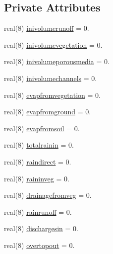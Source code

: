 \subsection*{Private Attributes}
\begin{DoxyCompactItemize}
\item 
real(8) \mbox{\hyperlink{structmodulebasin_1_1t__watermassbalance_a207bc9b7cd8688189b7627d620f7df89}{inivolumerunoff}} = 0.
\item 
real(8) \mbox{\hyperlink{structmodulebasin_1_1t__watermassbalance_a5e02f1cf320ca7836d46605f1390851f}{inivolumevegetation}} = 0.
\item 
real(8) \mbox{\hyperlink{structmodulebasin_1_1t__watermassbalance_a5d7e7e56b37bc500dcf19b93492e6a74}{inivolumeporousmedia}} = 0.
\item 
real(8) \mbox{\hyperlink{structmodulebasin_1_1t__watermassbalance_a3163a2e4c9bd261b245b48e15a4387c9}{inivolumechannels}} = 0.
\item 
real(8) \mbox{\hyperlink{structmodulebasin_1_1t__watermassbalance_a8d0fb45b48cf8e7c22ed8e4bc8cfefce}{evapfromvegetation}} = 0.
\item 
real(8) \mbox{\hyperlink{structmodulebasin_1_1t__watermassbalance_a61005aed0d52b803936a26ac88544d32}{evapfromground}} = 0.
\item 
real(8) \mbox{\hyperlink{structmodulebasin_1_1t__watermassbalance_aea7779cdd2bf2dabe5abf7e82f70228c}{evapfromsoil}} = 0.
\item 
real(8) \mbox{\hyperlink{structmodulebasin_1_1t__watermassbalance_a0570cd909fdb16715f93b98732753eba}{totalrainin}} = 0.
\item 
real(8) \mbox{\hyperlink{structmodulebasin_1_1t__watermassbalance_a6a274a7c070a6c1a8dca0c2d9ea5db47}{raindirect}} = 0.
\item 
real(8) \mbox{\hyperlink{structmodulebasin_1_1t__watermassbalance_af517ebe21961afc37e0cdbf0415a3208}{raininveg}} = 0.
\item 
real(8) \mbox{\hyperlink{structmodulebasin_1_1t__watermassbalance_af99cca06339aa536d06aaa234ecb914a}{drainagefromveg}} = 0.
\item 
real(8) \mbox{\hyperlink{structmodulebasin_1_1t__watermassbalance_a8eb4cd98b9b10b0129971f32514c02f9}{rainrunoff}} = 0.
\item 
real(8) \mbox{\hyperlink{structmodulebasin_1_1t__watermassbalance_aded674ac098a06ae9fb5128497b34335}{dischargesin}} = 0.
\item 
real(8) \mbox{\hyperlink{structmodulebasin_1_1t__watermassbalance_a13553d11ecadd80ed28f03df85714c95}{overtopout}} = 0.

\end{DoxyCompactItemize}
